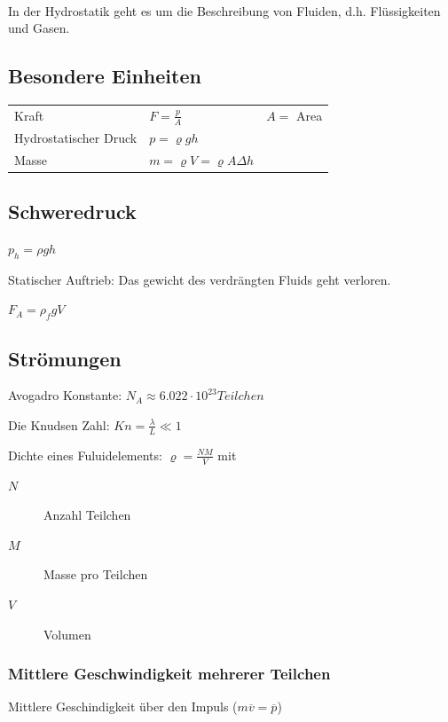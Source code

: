 \documentclass[a4paper]{scrartcl}
\begin{document}
	\hfill \\
	In der Hydrostatik geht es um die Beschreibung von Fluiden, d.h. Flüssigkeiten und Gasen.

\subsection{Besondere Einheiten} %
	\begin{tabu} {l X r}
		Kraft & $F = \frac{p}{A}$ & $A =$ Area\\
		Hydrostatischer Druck & $p = \varrho g h$ & \\
		Masse & $m = \varrho V = \varrho A \Delta h$
	\end{tabu}



\subsection{Schweredruck}


$p_h = \rho g h$


Statischer Auftrieb: Das gewicht des verdrängten Fluids geht verloren.

$F_A = \rho_f g V$

\subsection{Strömungen}

Avogadro Konstante: $N_A \approx 6.022 \cdot 10^23 Teilchen$

Die Knudsen Zahl: $Kn = \frac{\lambda}{L} \ll 1$

Dichte eines Fuluidelements: $\varrho = \frac{NM}{V}$ mit
\begin{description}
	\item[$N$] Anzahl Teilchen
	\item[$M$] Masse pro Teilchen 
	\item[$V$] Volumen
\end{description}

\subsubsection{Mittlere Geschwindigkeit mehrerer Teilchen}

Mittlere Geschindigkeit über den Impuls ($m\overline{v} = \overline{p}$)

\end{document}
